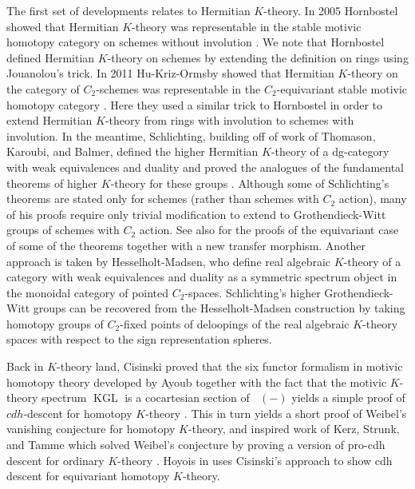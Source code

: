 \documentclass[edeposit,fullpage]{uiucthesis2009}
\DeclareMathOperator{\KGL}{KGL}
\DeclareMathOperator{\SH}{\underline{SH}}
\theoremstyle{plain}
\numberwithin{lemma}{section}
\theoremstyle{definition}
\begin{document}
The first set of developments relates to Hermitian $K$-theory. In 2005 Hornbostel showed that Hermitian $K$-theory was
representable in the stable motivic homotopy category on schemes
without involution \cite{Hornbos2005}. We note that Hornbostel defined
Hermitian $K$-theory on schemes by extending the definition on rings
using Jouanolou's trick. In 2011 Hu-Kriz-Ormsby showed that Hermitian
$K$-theory on the category of $C_2$-schemes was representable in the
$C_2$-equivariant stable motivic homotopy category \cite{HuKriz}. Here
they used a similar trick to Hornbostel in order to extend Hermitian
$K$-theory from rings with involution to schemes with involution. In
the meantime, Schlichting, building off of work of Thomason,
Karoubi, and Balmer, defined the higher Hermitian $K$-theory of a dg-category
with weak equivalences and duality and proved the analogues of the
fundamental theorems of higher $K$-theory for these groups
\cite{Schder}. Although some of Schlichting's theorems are stated only
for schemes (rather than schemes with $C_2$ action), many of his
proofs require only trivial modification to extend to Grothendieck-Witt
groups of schemes with $C_2$ action. See also \cite{Xie2018ATM} for
the proofs of the equivariant case of some of the theorems together with a new
transfer morphism. Another approach is taken by Hesselholt-Madsen, who
define real algebraic $K$-theory of a category with weak equivalences
and duality as a symmetric spectrum object in the monoidal category of
pointed $C_2$-spaces. Schlichting's higher Grothendieck-Witt groups can be
recovered from the Hesselholt-Madsen construction by taking
homotopy groups of $C_2$-fixed points of deloopings of the real
algebraic $K$-theory spaces with respect to the sign representation spheres. 

Back in $K$-theory land, Cisinski proved that the six
functor formalism in motivic homotopy theory developed by Ayoub
\cite{Ayoub} together with the fact that the motivic $K$-theory
spectrum $\KGL$ is a cocartesian section of $\SH(-)$ yields a simple
proof of $cdh$-descent for homotopy $K$-theory \cite{DenRep}. This in
turn yields a short proof of Weibel's vanishing conjecture for homotopy
$K$-theory, and inspired work of Kerz, Strunk, and Tamme which solved
Weibel's conjecture by proving a version of pro-cdh descent for
ordinary $K$-theory \cite{KerzStrunkTamme}. Hoyois in \cite{cdhdesc}
uses Cisinski's approach to show cdh descent for equivariant homotopy $K$-theory.
\end{document}
